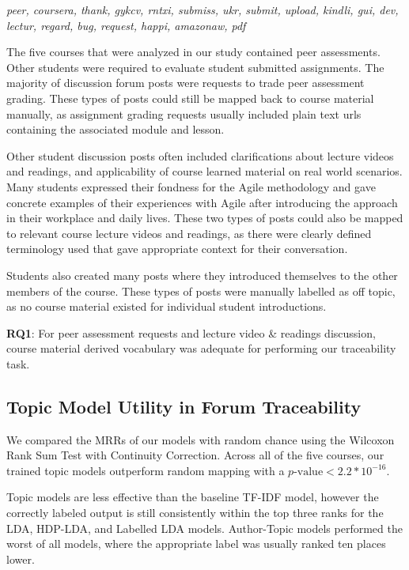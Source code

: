 \documentclass[sigconf, anonymous]{acmart}
\begin{document}
\begin{center}
\emph{
    peer, coursera, thank, gykcv, rntxi, submiss, ukr, submit, upload, kindli, gui, dev, lectur, regard, bug, request, happi, amazonaw, pdf
}
\end{center}

The five courses that were analyzed in our study contained peer assessments.
Other students were required to evaluate student submitted assignments.
The majority of discussion forum posts were requests to trade peer assessment grading.
These types of posts could still be mapped back to course material manually, as  assignment grading requests usually included plain text urls containing the associated module and lesson.

Other student discussion posts often included clarifications about lecture videos and readings, and applicability of course learned material on real world scenarios.
Many students expressed their fondness for the Agile methodology and gave concrete examples of their experiences with Agile after introducing the approach in their workplace and daily lives.
These two types of posts could also be mapped to relevant course lecture videos and readings, as there were clearly defined terminology used that gave appropriate context for their conversation.

Students also created many posts where they introduced themselves to the other members of the course. 
These types of posts were manually labelled as off topic, as no course material existed for individual student introductions.

\begin{tcolorbox}[sharp corners, top=1mm, bottom=1mm]
\textbf{RQ1}: For peer assessment requests and lecture video \& readings discussion, course material derived vocabulary was adequate for performing our traceability task.
\end{tcolorbox}

\subsection{Topic Model Utility in Forum Traceability}
We compared the MRRs of our models with random chance using the Wilcoxon Rank Sum Test with Continuity Correction.
Across all of the five courses, our trained topic models outperform random mapping with a $p\text{-value} < 2.2 * 10^{-16}$.

Topic models are less effective than the baseline TF-IDF model, however the correctly labeled output is still consistently within the top three ranks for the LDA, HDP-LDA, and Labelled LDA models. Author-Topic models performed the worst of all models, where the appropriate label was usually ranked ten places lower. %
\end{document}
